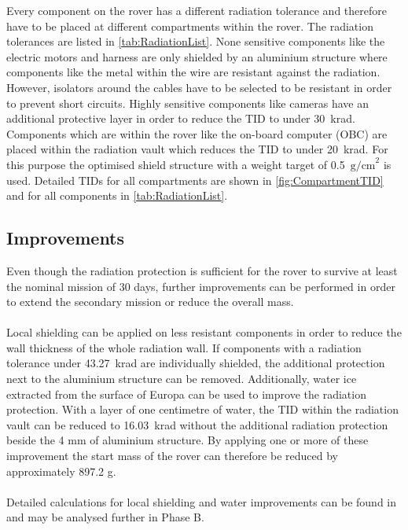 Every component on the rover has a different radiation tolerance and therefore have to be placed at different compartments within the rover. The radiation tolerances are listed in \autoref{tab:RadiationList}. None sensitive components like the electric motors and harness are only shielded by an aluminium structure where components like the metal within the wire are resistant against the radiation. However, isolators around the cables have to be selected to be resistant in order to prevent short circuits. Highly sensitive components like cameras have an additional protective layer in order to reduce the TID to under 30~krad. Components which are within the rover like the on-board computer (OBC) are placed within the radiation vault which reduces the TID to under 20~krad. For this purpose the optimised shield structure with a weight target of 0.5~\(\text{g/cm}^2\) is used. Detailed TIDs for all compartments are shown in \autoref{fig:CompartmentTID} and for all components in \autoref{tab:RadiationList}.

\subsection{Improvements}

\label{subsec:RadiationImprovements}

Even though the radiation protection is sufficient for the rover to survive at least the nominal mission of 30 days, further improvements can be performed in order to extend the secondary mission or reduce the overall mass. \\ \\
Local shielding can be applied on less resistant components in order to reduce the wall thickness of the whole radiation wall. If components with a radiation tolerance under 43.27~krad are individually shielded, the additional protection next to the aluminium structure can be removed. Additionally, water ice extracted from the surface of Europa can be used to improve the radiation protection. With a layer of one centimetre of water, the TID within the radiation vault can be reduced to 16.03~krad without the additional radiation protection beside the 4 mm of aluminium structure. By applying one or more of these improvement the start mass of the rover can therefore be reduced by approximately 897.2 g. \\ \\
Detailed calculations for local shielding and water improvements can be found in  and may be analysed further in Phase B.


